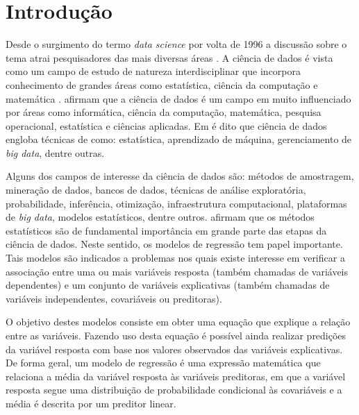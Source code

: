 \chapter{Introdução}

\label{cap:intro}


Desde o surgimento do termo \emph{data science} por volta de 1996 \citep{histds} a discussão sobre o tema atrai pesquisadores das mais diversas áreas \citep{cao2016data}. A ciência de dados é vista como um campo de estudo de natureza interdisciplinar que incorpora conhecimento de grandes áreas como estatística, ciência da computação e matemática \citep{ley2018makes}. \citet{weihs2018data} afirmam que a ciência de dados é um campo em muito influenciado por áreas como informática, ciência da computação, matemática, pesquisa operacional, estatística e ciências aplicadas. Em \citep{cao2016data} é dito que ciência de dados engloba técnicas de como: estatística, aprendizado de máquina, gerenciamento de \emph{big data}, dentre outras. 

Alguns dos campos de interesse da ciência de dados são: métodos de amostragem, mineração de dados, bancos de dados, técnicas de análise exploratória, probabilidade, inferência, otimização, infraestrutura computacional, plataformas de \emph{big data}, modelos estatísticos, dentre outros. \citet{weihs2018data} afirmam que os métodos estatísticos são de fundamental importância em grande parte das etapas da ciência de dados. Neste sentido, os modelos de regressão tem papel importante. Tais modelos são indicados a problemas nos quais existe interesse em verificar a associação entre uma ou mais variáveis resposta (também chamadas de variáveis dependentes) e um conjunto de variáveis explicativas (também chamadas de variáveis independentes, covariáveis ou preditoras). 

O objetivo destes modelos consiste em obter uma equação que explique a relação entre as variáveis. Fazendo uso desta equação é possível ainda realizar predições da variável resposta com base nos valores observados das variáveis explicativas. De forma geral, um modelo de regressão é uma expressão matemática que relaciona a média da variável resposta às variáveis preditoras, em que a variável resposta segue uma distribuição de probabilidade condicional às covariáveis e a média é descrita por um preditor linear.


